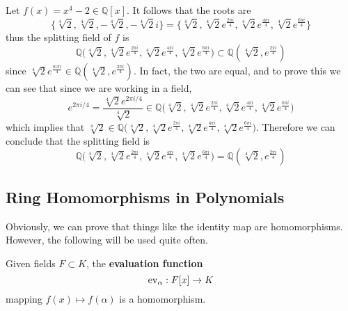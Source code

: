   \begin{example}
    Let $f(x) = x^4 - 2 \in \mathbb{Q}[x]$. It follows that the roots are 
    \begin{equation}
      \{ \sqrt[4]{2}, \sqrt[4]{2}, -\sqrt[4]{2}, - \sqrt[4]{2} i \} = \Big\{ \sqrt[4]{2}, \sqrt[4]{2} e^{\frac{2\pi i}{4}}, \sqrt[4]{2} e^{\frac{4\pi i}{4}}, \sqrt[4]{2} e^{\frac{6\pi i}{4}} \Big\}
    \end{equation}
    thus the splitting field of $f$ is 
    \begin{equation}
      \mathbb{Q} \big( \sqrt[4]{2}, \sqrt[4]{2} e^{\frac{2\pi i}{4}}, \sqrt[4]{2} e^{\frac{4\pi i}{4}}, \sqrt[4]{2} e^{\frac{6\pi i}{4}} \big) \subset \mathbb{Q}(\sqrt[4]{2}, e^{\frac{2\pi i}{4}})
    \end{equation}
    since $\sqrt[4]{2} e^{\frac{m \pi i}{4}} \in \mathbb{Q}(\sqrt[4]{2}, e^{\frac{2\pi i}{4}})$. In fact, the two are equal, and to prove this we can see that since we are working in a field, 
    \begin{equation}
      e^{2 \pi i / 4} = \frac{\sqrt[4]{2} e^{2\pi i/4}}{\sqrt[4]{2}} \in \mathbb{Q} \big( \sqrt[4]{2}, \sqrt[4]{2} e^{\frac{2\pi i}{4}}, \sqrt[4]{2} e^{\frac{4\pi i}{4}}, \sqrt[4]{2} e^{\frac{6\pi i}{4}} \big) 
    \end{equation}
    which implies that $\sqrt[4]{2} \in \mathbb{Q} \big( \sqrt[4]{2}, \sqrt[4]{2} e^{\frac{2\pi i}{4}}, \sqrt[4]{2} e^{\frac{4\pi i}{4}}, \sqrt[4]{2} e^{\frac{6\pi i}{4}} \big)$. Therefore we can conclude that the splitting field is 
    \begin{equation}
      \mathbb{Q} \big( \sqrt[4]{2}, \sqrt[4]{2} e^{\frac{2\pi i}{4}}, \sqrt[4]{2} e^{\frac{4\pi i}{4}}, \sqrt[4]{2} e^{\frac{6\pi i}{4}} \big) = \mathbb{Q}(\sqrt[4]{2}, e^{\frac{2\pi i}{4}})
    \end{equation}
  \end{example} 

\subsection{Ring Homomorphisms in Polynomials} 
  
  Obviously, we can prove that things like the identity map are homomorphisms. However, the following will be used quite often. 

  \begin{example}
    Given fields $F \subset K$, the \textbf{evaluation function} 
    \begin{equation}
      \ev_\alpha: F[x] \rightarrow K
    \end{equation}
    mapping $f(x) \mapsto f(\alpha)$ is a homomorphism. 
  \end{example}

